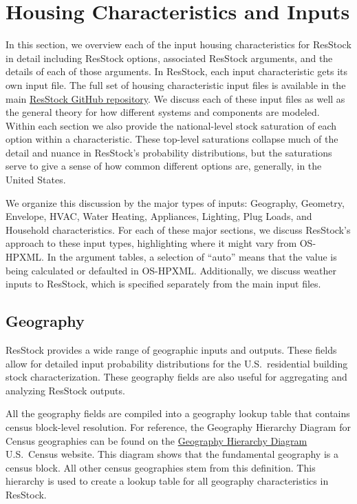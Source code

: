 \chapter{Housing Characteristics and Inputs} \label{sec:resstock_inputs}

In this section, we overview each of the input housing characteristics for ResStock in detail including ResStock options, associated ResStock arguments, and the details of each of those arguments. In ResStock, each input characteristic gets its own input file. The full set of housing characteristic input files is available in the main \href{https://github.com/NREL/resstock/tree/v3.3.0/project_national}{ResStock GitHub repository}.  We discuss each of these input files as well as the general theory for how different systems and components are modeled. Within each section we also provide the national-level stock saturation of each option within a characteristic. These top-level saturations collapse much of the detail and nuance in ResStock's probability distributions, but the saturations serve to give a sense of how common different options are, generally, in the United States.

We organize this discussion by the major types of inputs: Geography, Geometry, Envelope, HVAC, Water Heating, Appliances, Lighting, Plug Loads, and Household characteristics. For each of these major sections, we discuss ResStock's approach to these input types, highlighting where it might vary from OS-HPXML. In the argument tables, a selection of ``auto'' means that the value is being calculated or defaulted in OS-HPXML. Additionally, we discuss weather inputs to ResStock, which is specified separately from the main input files. 

\section{Geography}
ResStock provides a wide range of geographic inputs and outputs. These fields allow for detailed input probability distributions for the U.S.~residential building stock characterization. These geography fields are also useful for aggregating and analyzing ResStock outputs.

All the geography fields are compiled into a geography lookup table that contains census block-level resolution. For reference, the Geography Hierarchy Diagram for Census geographies can be found on the \href{https://www2.census.gov/geo/pdfs/reference/geodiagram.pdf}{Geography Hierarchy Diagram} U.S.~Census website. This diagram shows that the fundamental geography is a census block. All other census geographies stem from this definition. This hierarchy is used to create a lookup table for all geography characteristics in ResStock. 


